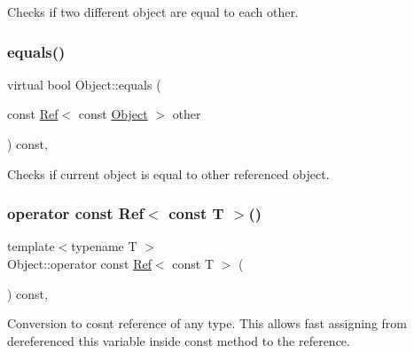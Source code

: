 Checks if two different object are equal to each other. 

\mbox{\label{class_object_a8c094a3284ac6d2ebedfa9645e95c35a}} 
\subsubsection{\texorpdfstring{equals()}{equals()}\hspace{0.1cm}{\footnotesize\ttfamily [2/2]}}
{\footnotesize\ttfamily virtual bool Object\+::equals (\begin{DoxyParamCaption}\item[{const \mbox{\hyperlink{class_ref}{Ref}}$<$ const \mbox{\hyperlink{class_object}{Object}} $>$}]{other }\end{DoxyParamCaption}) const\hspace{0.3cm}{\ttfamily [inline]}, {\ttfamily [virtual]}}



Checks if current object is equal to other referenced object. 

\mbox{\label{class_object_ad552aa04f3c6954d73ea7611c169853c}} 
\subsubsection{\texorpdfstring{operator const Ref$<$ const T $>$()}{operator const Ref< const T >()}}
{\footnotesize\ttfamily template$<$typename T $>$ \\
Object\+::operator const \mbox{\hyperlink{class_ref}{Ref}}$<$ const T $>$ (\begin{DoxyParamCaption}{ }\end{DoxyParamCaption}) const\hspace{0.3cm}{\ttfamily [inline]}, {\ttfamily [protected]}}



Conversion to cosnt reference of any type. This allows fast assigning from dereferenced this variable inside const method to the reference. 

\mbox{\label{class_object_af1fedc8e131c2654cd31830786efc720}} 
